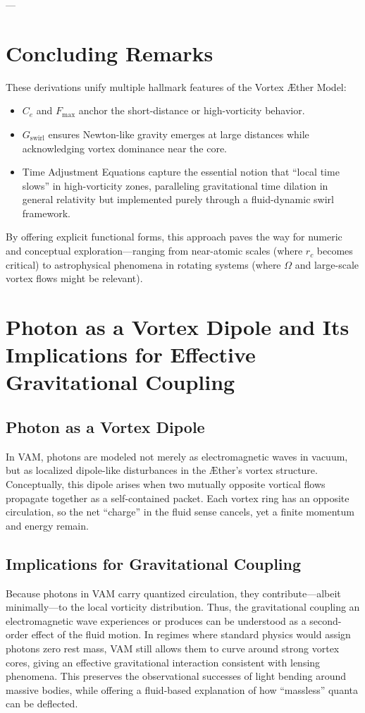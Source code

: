 \documentclass[aps,preprint,superscriptaddress]{revtex4-2}
\begin{document}
    ---

    \section{Concluding Remarks}

    These derivations unify multiple hallmark features of the Vortex Æther Model:
    \begin{itemize}
        \item \(C_e\) and \(F_{\max}\) anchor the short-distance or high-vorticity behavior.
        \item \(G_{\text{swirl}}\) ensures Newton-like gravity emerges at large distances while acknowledging vortex dominance near the core.
        \item Time Adjustment Equations capture the essential notion that “local time slows” in high-vorticity zones, paralleling gravitational time dilation in general relativity but implemented purely through a fluid-dynamic swirl framework.
    \end{itemize}

    By offering explicit functional forms, this approach paves the way for numeric and conceptual exploration—ranging from near-atomic scales (where \(r_c\) becomes critical) to astrophysical phenomena in rotating systems (where \(\Omega\) and large-scale vortex flows might be relevant).

    \section{Photon as a Vortex Dipole and Its Implications for Effective Gravitational Coupling}

    \subsection{Photon as a Vortex Dipole}
    In VAM, photons are modeled not merely as electromagnetic waves in vacuum, but as localized dipole-like disturbances in the Æther's vortex structure. Conceptually, this dipole arises when two mutually opposite vortical flows propagate together as a self-contained packet. Each vortex ring has an opposite circulation, so the net “charge” in the fluid sense cancels, yet a finite momentum and energy remain.

    \subsection{Implications for Gravitational Coupling}
    Because photons in VAM carry quantized circulation, they contribute—albeit minimally—to the local vorticity distribution. Thus, the gravitational coupling an electromagnetic wave experiences or produces can be understood as a second-order effect of the fluid motion. In regimes where standard physics would assign photons zero rest mass, VAM still allows them to curve around strong vortex cores, giving an effective gravitational interaction consistent with lensing phenomena. This preserves the observational successes of light bending around massive bodies, while offering a fluid-based explanation of how “massless” quanta can be deflected.
\end{document}
